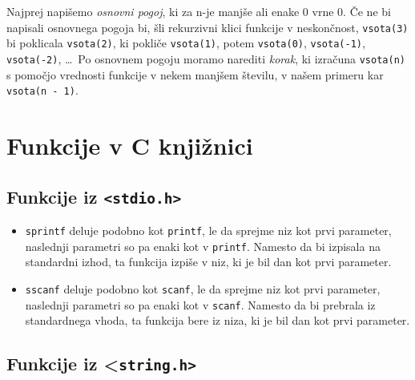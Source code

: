 \begin{examples}
\end{examples}

Najprej napišemo \emph{osnovni pogoj}, ki za n-je manjše ali enake 0 vrne 0. Če
ne bi napisali osnovnega pogoja bi, šli rekurzivni klici funkcije v neskončnost,
\verb+vsota(3)+ bi poklicala \verb+vsota(2)+, ki pokliče \verb+vsota(1)+, potem
\verb+vsota(0)+, \verb+vsota(-1)+, \verb+vsota(-2)+, \ldots \ Po osnovnem
pogoju moramo narediti \emph{korak}, ki izračuna \verb+vsota(n)+ s pomočjo
vrednosti funkcije v nekem manjšem številu, v našem primeru kar
\verb+vsota(n - 1)+.


\section{Funkcije v C knjižnici}

\subsection{Funkcije iz \texttt{<stdio.h>}}

\begin{itemize}
    \item \verb+sprintf+ deluje podobno kot \verb+printf+, le da sprejme niz
        kot prvi parameter, naslednji parametri so pa enaki kot v
        \verb+printf+. Namesto da bi izpisala na standardni izhod, ta funkcija
        izpiše v niz, ki je bil dan kot prvi parameter.
    \item \verb+sscanf+ deluje podobno kot \verb+scanf+, le da sprejme niz kot
        prvi parameter, naslednji parametri so pa enaki kot v \verb+scanf+.
        Namesto da bi prebrala iz standardnega vhoda, ta funkcija bere iz niza,
        ki je bil dan kot prvi parameter.
\end{itemize}

\begin{examples}
\end{examples}

\subsection{Funkcije iz <\texttt{string.h>}}


